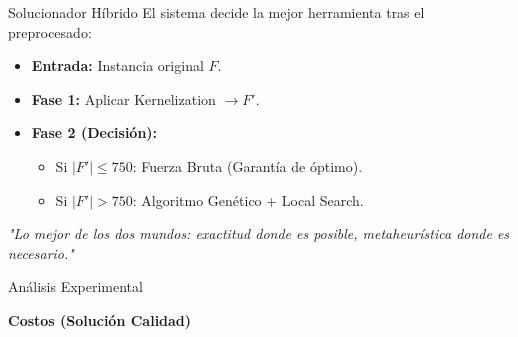 \documentclass[10pt]{beamer}
\begin{document}
\begin{frame}{Solucionador Híbrido}
    El sistema decide la mejor herramienta tras el preprocesado:
    \centering
    \begin{itemize}
        \item \textbf{Entrada:} Instancia original $F$.
        \item \textbf{Fase 1:} Aplicar Kernelization $\to F'$.
        \item \textbf{Fase 2 (Decisión):}
        \begin{itemize}
            \item Si $|F'| \le 750$: Fuerza Bruta (Garantía de óptimo).
            \item Si $|F'| > 750$: Algoritmo Genético + Local Search.
        \end{itemize}
    \end{itemize}
    \vspace{0.3cm}
    \textit{"Lo mejor de los dos mundos: exactitud donde es posible, metaheurística donde es necesario."}
\end{frame}

\begin{frame}{Análisis Experimental}

            \textbf{Costos (Solución Calidad)}
    

\end{frame}
\end{document}
